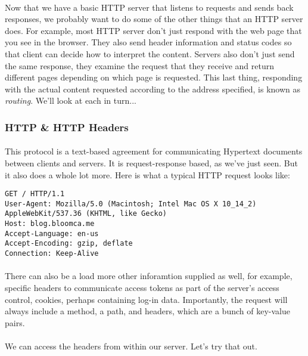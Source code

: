 \documentclass[10pt, a4paper, twosize]{article}
\begin{document}
\paragraph{} Now that we have a basic HTTP server that listens to requests and sends back responses, we probably want to do some of the other things that an HTTP server does. For example, most HTTP server don't just respond with the web page that you see in the browser. They also send header information and status codes so that client can decide how to interpret the content. Servers also don't just send the same response, they examine the request that they receive and return different pages depending on which page is requested. This last thing, responding with the actual content requested according to the address specified, is known as \emph{routing}. We'll look at each in turn...


\subsubsection{HTTP \& HTTP Headers}
\paragraph{} This protocol is a text-based agreement for communicating Hypertext documents between clients and servers. It is request-response based, as we've just seen. But it also does a whole lot more. Here is what a typical HTTP request looks like:

\begin{lstlisting}
GET / HTTP/1.1
User-Agent: Mozilla/5.0 (Macintosh; Intel Mac OS X 10_14_2) AppleWebKit/537.36 (KHTML, like Gecko)
Host: blog.bloomca.me
Accept-Language: en-us
Accept-Encoding: gzip, deflate
Connection: Keep-Alive
\end{lstlisting}

\paragraph{} There can also be a load more other inforamtion supplied as well, for example, specific headers to communicate access tokens as part of the server's access control, cookies, perhaps containing log-in data. Importantly, the request will always include a method, a path, and headers, which are a bunch of key-value pairs.

\paragraph{} We can access the headers from within our server. Let's try that out.
\end{document}
